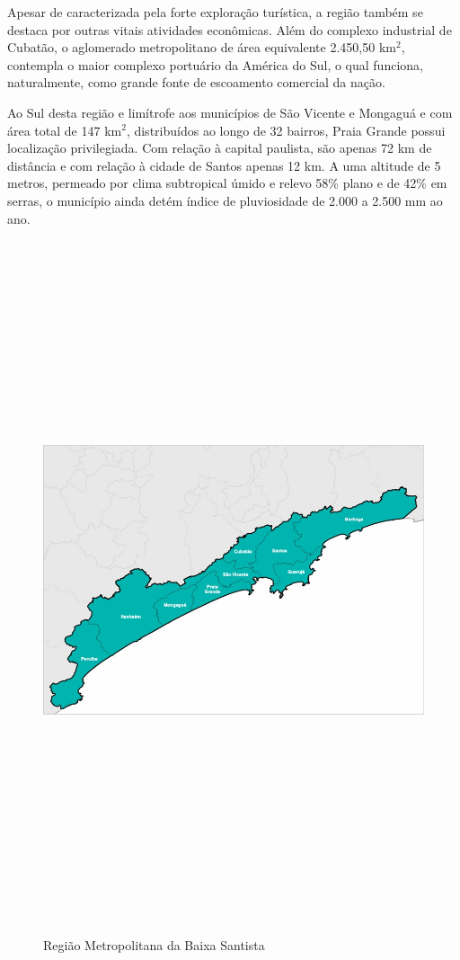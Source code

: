 	Apesar de caracterizada pela forte exploração turística, a região também se destaca por outras vitais atividades econômicas. Além do complexo industrial de Cubatão, o aglomerado metropolitano de área equivalente 2.450,50 km$^2$, contempla o maior complexo portuário da América do Sul, o qual funciona, naturalmente, como grande fonte de escoamento comercial da nação.
	 
	Ao Sul desta região e limítrofe aos municípios de São Vicente e Mongaguá e com área total de 147 km$^2$, distribuídos ao longo de 32 bairros, Praia Grande possui localização privilegiada. Com relação à capital paulista, são apenas 72 km de distância e com relação à cidade de Santos apenas 12 km. A uma altitude de 5 metros, permeado por clima subtropical úmido e relevo 58\% plano e de 42\% em serras, o município ainda detém índice de pluviosidade de 2.000 a 2.500 mm ao ano.
	
	\begin{landscape}
		\begin{figure}
			\centering
			\caption{Região Metropolitana da Baixa Santista}
			\includegraphics[width=20cm,height=20cm,keepaspectratio]{img/mapa_RMBS_emplasa.jpg}
			\label{mapa_rmbs}
		\end{figure}
	\end{landscape}
	 
